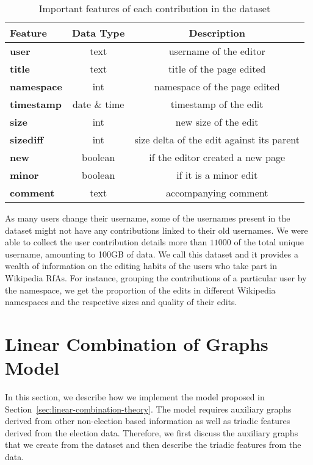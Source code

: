 \begin{table}[htp]
    \centering
    \caption{Important features of each contribution in the \usercontrib dataset}
    \label{tab:usercontrib-features}
    \begin{tabular}{lcc}
        \toprule
        Feature & Data Type & Description\\
        \midrule
        \textbf{user}&text& username of the editor\\
        \textbf{title}&text & title of the page edited\\
        \textbf{namespace}&int& namespace of the page edited\\
        \textbf{timestamp}&date \& time & timestamp of the edit\\
        \textbf{size}&int& new size of the edit \\
        \textbf{sizediff}& int & size delta of the edit against its parent\\
        \textbf{new}&boolean &if the editor created a new page \\
        \textbf{minor}&boolean& if it is a minor edit\\
        \textbf{comment}& text& accompanying comment\\
        \bottomrule
    \end{tabular}
\end{table}
As many users change their username, some of the usernames present in the \wikirfa dataset might not have any contributions linked to their old usernames.
We were able to collect the user contribution details more than $11000$ of the total unique username, amounting to 100GB of data.
We call this dataset \usercontrib and it provides a wealth of information on the editing habits of the users who take part in Wikipedia RfAs. 
For instance, grouping the contributions of a particular user by the namespace, we get the proportion of the edits in different Wikipedia namespaces and the respective sizes and quality of their edits.

\section{Linear Combination of Graphs Model}
\label{sec:linear-combination-implementation}
In this section, we describe how we implement the model proposed in Section~\ref{sec:linear-combination-theory}.
The model requires auxiliary graphs derived from other non-election based information as well as triadic features derived from the election data.
Therefore, we first discuss the auxiliary graphs that we create from the \usercontrib dataset and then describe the triadic features from the \wikirfa data.

